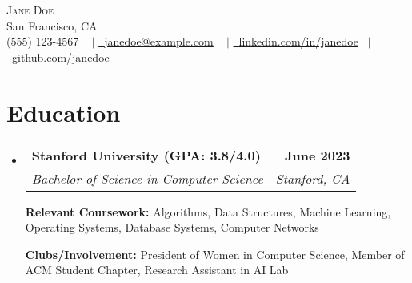\documentclass[letterpaper,11pt]{article}
\makeatletter
\newcommand{\resumeSubheading}[4]{
  \vspace{-2pt}\item
    \begin{tabular*}{1.0\textwidth}[t]{l@{\extracolsep{\fill}}r}
      \textbf{#1} & \textbf{\small #2} \\
      \textit{\small#3} & \textit{\small #4} \\
    \end{tabular*}\vspace{-7pt}
}
\newcommand{\resumeSubHeadingListStart}{\begin{itemize}[leftmargin=0.0in, label={}]}
\newcommand{\resumeSubHeadingListEnd}{\end{itemize}}
\makeatother
\begin{document}


\begin{center}
    {\Huge \scshape  Jane Doe  } \\ \vspace{1pt}
                \vspace{-1pt}
    San Francisco, CA \\ \vspace{0pt}
            \vspace{0pt}
    \small \raisebox{-0.1\height} (555) 123-4567 ~ $\vert$ \href{mailto:janedoe@example.com}{\raisebox{-0.2\height}\ \underline{janedoe@example.com}} ~ $\vert$
        \vspace{4pt}
    \href{https://linkedin.com/in/janedoe}{\raisebox{-0.2\height}\ \underline{linkedin.com/in/janedoe}}  ~$\vert$
    \href{https://github.com/janedoe}{\raisebox{-0.2\height}\ \underline{github.com/janedoe}}

    \vspace{-14pt}
\end{center}


\section{Education}
  \resumeSubHeadingListStart
    \resumeSubheading
      {Stanford University (GPA: 3.8/4.0)}{June 2023}
      {Bachelor of Science in Computer Science}{Stanford, CA}
          \vspace{-2pt}

    {\textbf{Relevant Coursework:}  Algorithms, Data Structures, Machine Learning, Operating Systems, Database Systems, Computer Networks}
          \vspace{-2pt}

    {\textbf{Clubs/Involvement:} President of Women in Computer Science, Member of ACM Student Chapter, Research Assistant in AI Lab}

  \resumeSubHeadingListEnd

\end{document}
